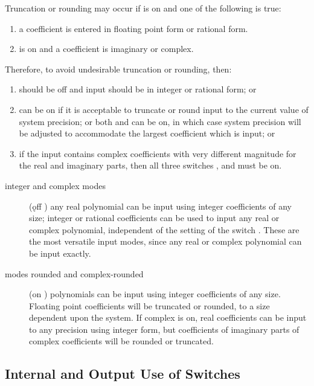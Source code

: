 Truncation or rounding may occur if  is on and
one of the following is true:

\begin{enumerate}
\item a coefficient is entered in floating point form or rational form.
\item {} is on and a coefficient is imaginary or complex.
\end{enumerate}

Therefore, to avoid undesirable truncation or rounding, then:

\begin{enumerate}
\item {} should be off and input should be
in integer or rational form; or
\item {} can be on if it is acceptable to truncate or round
input to the current value of system precision; or both  and
 can be on, in which case system precision will be adjusted
to accommodate the largest coefficient which is input; or 
\item if the
input contains complex coefficients with very different magnitude for the
real and imaginary parts, then all three switches ,  and 
 must be on.
\end{enumerate}

\begin{description}
\item[integer and complex modes] (\k{off} ) any real
polynomial can be input using integer coefficients of any size; integer or
rational coefficients can be used to input any real or complex polynomial,
independent of the setting of the switch .  These are the most
versatile input modes, since any real or complex polynomial can be input
exactly.

\item[modes rounded and complex-rounded] (on ) polynomials can be 
input using
integer coefficients of any size.  Floating point coefficients will be
truncated or rounded, to a size dependent upon the system.  If complex
is on, real coefficients can be input to any precision using integer
form, but coefficients of imaginary parts of complex coefficients will
be rounded or truncated.
\end{description}

\subsection{Internal and Output Use of Switches}

